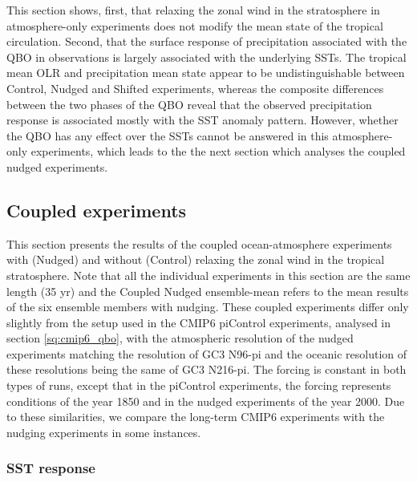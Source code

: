This section shows, first, that relaxing the zonal wind in the stratosphere in atmosphere-only experiments does not modify the mean state of the tropical circulation. Second, that the surface response of precipitation associated with the QBO in observations is largely associated with the underlying SSTs. The tropical mean OLR and precipitation mean state appear to be undistinguishable between Control, Nudged and Shifted experiments, whereas the composite differences between the two phases of the QBO reveal that the observed precipitation response is associated mostly with the SST anomaly pattern. However, whether the QBO has any effect over the SSTs cannot be answered in this atmosphere-only experiments, which leads to the the next section which analyses the coupled nudged experiments. 

\subsection{Coupled experiments}


This section presents the results of the coupled ocean-atmosphere experiments with (Nudged) and without (Control) relaxing the zonal wind in the tropical stratosphere. Note that all the individual experiments in this section are the same length (35 yr) and the Coupled Nudged ensemble-mean refers to the mean results of the six ensemble members with nudging.
These coupled experiments differ only slightly from the setup used in the CMIP6 piControl experiments, analysed in section \ref{sq:cmip6_qbo}, with the atmospheric resolution of the nudged experiments matching the resolution of GC3 N96-pi and the oceanic resolution of these resolutions being the same of GC3 N216-pi. The forcing is constant in both types of runs, except that in the piControl experiments, the forcing represents conditions of the year 1850 and in the nudged experiments of the year 2000. 
Due to these similarities, we compare the long-term CMIP6 experiments with the nudging experiments in some instances.

\subsubsection{SST response}

